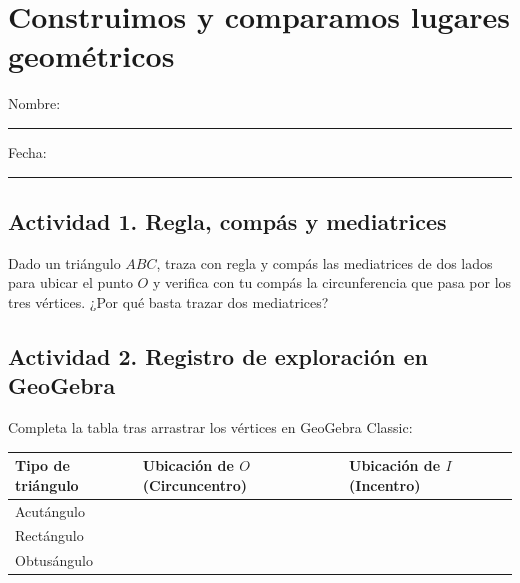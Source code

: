 \documentclass[spanish,letterpaper,oneside]{article}
\begin{document}
\templatePortrait\templatePagecfg\templateFinalcfg\fancyfoot{}\fancyfoot[C]{\scriptsize\thepage}\raggedbottom

\section*{Construimos y comparamos lugares geométricos}
Nombre: \rule{8cm}{.2pt}\hfill Fecha: \rule{2.5cm}{.2pt}

\subsection*{Actividad 1. Regla, compás y mediatrices}
Dado un triángulo $ABC$, traza con regla y compás las mediatrices de dos lados para ubicar el punto $O$ y verifica con tu compás la circunferencia que pasa por los tres vértices. ¿Por qué basta trazar dos mediatrices?
\vspace{2.0cm}

\subsection*{Actividad 2. Registro de exploración en GeoGebra}
Completa la tabla tras arrastrar los vértices en GeoGebra Classic:

\begin{center}
\begin{tabular}{|l|p{5.2cm}|p{5.2cm}|}\hline
\textbf{Tipo de triángulo} & \textbf{Ubicación de $O$ (Circuncentro)} & \textbf{Ubicación de $I$ (Incentro)} \\\hline
Acutángulo & & \\[0.6cm]\hline
Rectángulo & & \\[0.6cm]\hline
Obtusángulo & & \\[0.6cm]\hline
\end{tabular}
\end{center}
\end{document}
